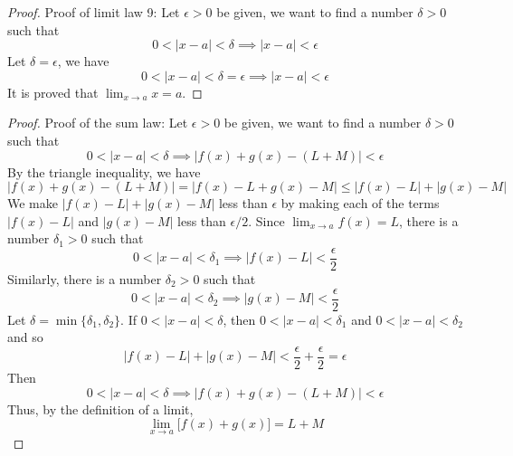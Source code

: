 \begin{proof}
    Proof of limit law 9:
    Let \(\epsilon>0\) be given,
    we want to find a number \(\delta>0\) such
    that \[0<|x-a|<\delta\implies|x-a|<\epsilon\]
    Let \(\delta=\epsilon\),
    we have
    \[0<|x-a|<\delta=\epsilon\implies|x-a|<\epsilon\]
    It is proved that \(\displaystyle{\lim_{x\to a}x=a}\).
\end{proof}
\begin{proof}
    Proof of the sum law:
    Let \(\epsilon>0\) be given,
    we want to find a number \(\delta>0\) such that
    \[0<|x-a|<\delta\implies|f(x)+g(x)-(L+M)|<\epsilon\]
    By the triangle inequality,
    we have
    \[|f(x)+g(x)-(L+M)|=|f(x)-L+g(x)-M|\leq|f(x)-L|+|g(x)-M|\]
    We make \(|f(x)-L|+|g(x)-M|\) less than \(\epsilon\) by making each of the
    terms \(|f(x)-L|\) and \(|g(x)-M|\) less than \(\epsilon/2\).
    Since \(\displaystyle{\lim_{x\to a}f(x)=L}\),
    there is a number \(\delta_1>0\) such that
    \[0<|x-a|<\delta_1\implies|f(x)-L|<\frac{\epsilon}{2}\]
    Similarly,
    there is a number \(\delta_2>0\) such that
    \[0<|x-a|<\delta_2\implies|g(x)-M|<\frac{\epsilon}{2}\]
    Let \(\delta=\min\{\delta_1,\delta_2\}\).
    If \(0<|x-a|<\delta\),
    then \(0<|x-a|<\delta_1\) and \(0<|x-a|<\delta_2\)
    and so
    \[|f(x)-L|+|g(x)-M|<\frac{\epsilon}{2}+\frac{\epsilon}{2}=\epsilon\]
    Then
    \[0<|x-a|<\delta\implies|f(x)+g(x)-(L+M)|<\epsilon\]
    Thus,
    by the definition of a limit,
    \[\lim_{x\to a}\bigl[f(x)+g(x)\bigr]=L+M\]
\end{proof}
